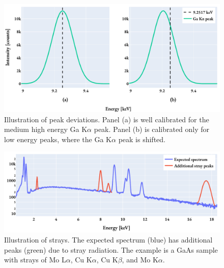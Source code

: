 \begin{figure}[htp]
    \centering
    \includegraphics[width=0.8\linewidth]{figures/pp_peak_deviation.pdf}
    \caption{
        Illustration of peak deviations.
        Panel (a) is well calibrated for the medium high energy Ga K$\alpha$ peak.
        Panel (b) is calibrated only for low energy peaks, where the Ga K$\alpha$ peak is shifted.
    }
    \label{fig:theory:eds_performance:overview:peak_deviations}
\end{figure}

\begin{figure}[htp]
    \centering
    \includegraphics[width=0.8\linewidth]{figures/pp_strays.pdf}
    \caption{
        Illustration of strays.
        The expected spectrum (blue) has additional peaks (green) due to stray radiation.
        The example is a GaAs sample with strays of Mo L$\alpha$, Cu K$\alpha$, Cu K$\beta$, and Mo K$\alpha$.
    }
    \label{fig:theory:eds_performance:overview:strays}
\end{figure}




